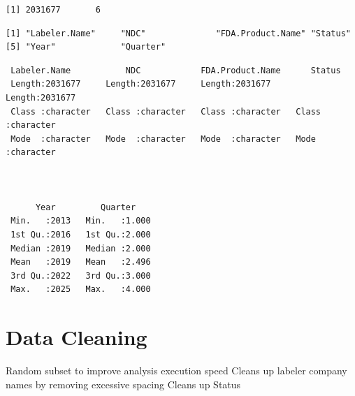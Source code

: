 \documentclass[
  letterpaper,
  DIV=11,
  numbers=noendperiod]{scrartcl}
\begin{document}
\begin{verbatim}
[1] 2031677       6
\end{verbatim}

\begin{verbatim}
[1] "Labeler.Name"     "NDC"              "FDA.Product.Name" "Status"          
[5] "Year"             "Quarter"         
\end{verbatim}

\begin{verbatim}
 Labeler.Name           NDC            FDA.Product.Name      Status         
 Length:2031677     Length:2031677     Length:2031677     Length:2031677    
 Class :character   Class :character   Class :character   Class :character  
 Mode  :character   Mode  :character   Mode  :character   Mode  :character  
                                                                            
                                                                            
                                                                            
      Year         Quarter     
 Min.   :2013   Min.   :1.000  
 1st Qu.:2016   1st Qu.:2.000  
 Median :2019   Median :2.000  
 Mean   :2019   Mean   :2.496  
 3rd Qu.:2022   3rd Qu.:3.000  
 Max.   :2025   Max.   :4.000  
\end{verbatim}

\section{Data Cleaning}\label{data-cleaning}

Random subset to improve analysis execution speed Cleans up labeler
company names by removing excessive spacing Cleans up Status
\end{document}
